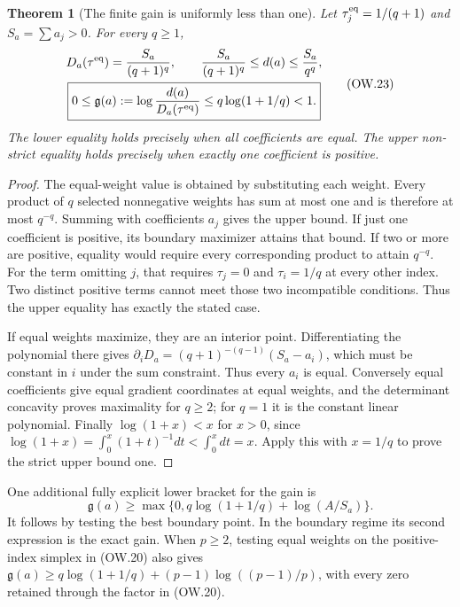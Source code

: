\documentclass[11pt]{article}
\newtheorem{theorem}{Theorem}[section]
\begin{document}
\begin{theorem}[The finite gain is uniformly less than one]
Let $\tau^{\rm eq}_j=1/(q+1)$ and $S_a=\sum a_j>0$.
For every $q\ge1$,
\[
 \begin{gathered}
 D_a(\tau^{\rm eq})=\frac{S_a}{(q+1)^q},\qquad
 \frac{S_a}{(q+1)^q}\le d(a)\le\frac{S_a}{q^q},\\
 \boxed{0\le\mathfrak g(a):=
 \log\frac{d(a)}{D_a(\tau^{\rm eq})}
 \le q\log(1+1/q)<1.}
 \end{gathered}                                           \tag{OW.23}
\]
The lower equality holds precisely when all coefficients are equal.
The upper non-strict equality holds precisely when exactly one
coefficient is positive.
\end{theorem}
\begin{proof}
The equal-weight value is obtained by substituting each weight.
Every product of $q$ selected nonnegative weights has sum at most
one and is therefore at most $q^{-q}$. Summing with coefficients
$a_j$ gives the upper bound. If just one coefficient is positive,
its boundary maximizer attains that bound. If two or more are
positive, equality would require every corresponding product to
attain $q^{-q}$. For the term omitting $j$, that requires
$\tau_j=0$ and $\tau_i=1/q$ at every other index. Two distinct
positive terms cannot meet those two incompatible conditions.
Thus the upper equality has exactly the stated case.

If equal weights maximize, they are an interior point. Differentiating
the polynomial there gives
$\partial_iD_a=(q+1)^{-(q-1)}(S_a-a_i)$, which must be constant
in $i$ under the sum constraint. Thus every $a_i$ is equal.
Conversely equal coefficients give equal gradient coordinates at
equal weights, and the determinant concavity proves maximality
for $q\ge2$; for $q=1$ it is the constant linear polynomial.
Finally $\log(1+x)<x$ for $x>0$, since
$\log(1+x)=\int_0^x(1+t)^{-1}dt<\int_0^xdt=x$.
Apply this with $x=1/q$ to prove the strict upper bound one.
\end{proof}

One additional fully explicit lower bracket for the gain is
\[
 \mathfrak g(a)\ge
 \max\{0,q\log(1+1/q)+\log(A/S_a)\}.                    \tag{OW.24}
\]
It follows by testing the best boundary point. In the boundary
regime its second expression is the exact gain. When $p\ge2$,
testing equal weights on the positive-index simplex in (OW.20)
also gives
$\mathfrak g(a)\ge q\log(1+1/q)
+(p-1)\log((p-1)/p)$, with every zero retained through the
factor in (OW.20).
\end{document}
